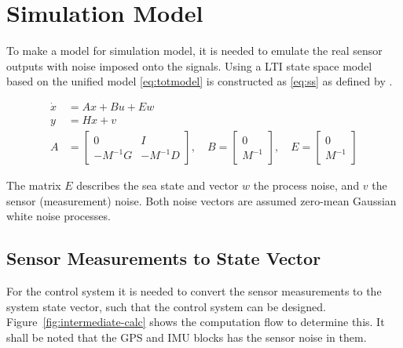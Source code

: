 \chapter{Simulation Model}
\label{ch:simulation-model}

To make a model for simulation model, it is needed to emulate the real
sensor outputs with noise imposed onto the signals. Using a \ac{LTI}
state space model based on the unified model \vref{eq:totmodel} is
constructed as \vref{eq:ss} as defined by \citep[p. 175]{fossen}.

\begin{subequations}
\begin{align}
	\dot x &=  A x + B u + E w \\
	y &= H x + v \\
	A &=
	\begin{bmatrix}
		0 & I\\ -M^{-1}G & -M^{-1}D
	\end{bmatrix}, \quad
	B = 
	\begin{bmatrix}
		0 \\ M^{-1}
	\end{bmatrix}, \quad
	E =
	\begin{bmatrix}
		0 \\ M^{-1}
	\end{bmatrix}
\end{align}
\label{eq:ss}
\end{subequations}

The matrix $E$ describes the sea state and vector $w$ the process noise, and $v$ the sensor (measurement) noise. Both noise
vectors are assumed zero-mean Gaussian white noise processes.


\section{Sensor Measurements to State Vector}
For the control system it is needed to convert the sensor measurements
to the system state vector, such that the control system can be
designed. Figure~\vref{fig:intermediate-calc} shows the computation
flow to determine this. It shall be noted that the \ac{GPS} and
\ac{IMU} blocks has the sensor noise in them.

